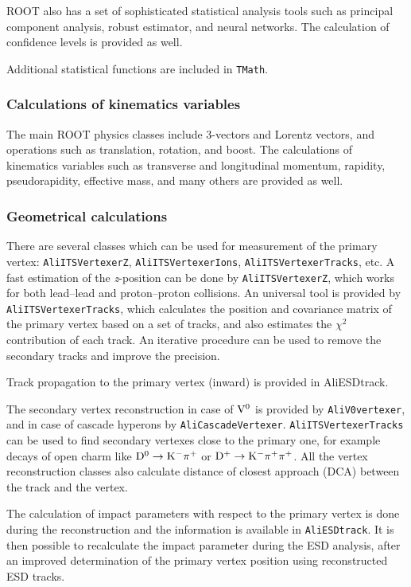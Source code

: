 \documentclass[12pt,a4paper,twoside]{article}
\makeatletter
\newcommand {\ROOT} {ROOT\@\xspace}
\makeatother
\begin{document}
{\ROOT also has a set of sophisticated statistical analysis tools such as
principal component analysis, robust estimator, and neural networks.
The calculation of confidence levels is provided as well.

Additional statistical functions are included in \texttt{TMath}.

\subsubsection{Calculations of kinematics variables}

The main \ROOT physics classes include 3-vectors and Lorentz
vectors, and operations
such as translation, rotation, and boost. The calculations of
kinematics variables 
such as transverse and longitudinal momentum, rapidity,
pseudorapidity, effective mass, and many others are provided as well.


\subsubsection{Geometrical calculations}

There are several classes which can be used for
measurement of the primary vertex: \texttt{AliITSVertexerZ},
\texttt{AliITSVertexerIons}, \texttt{AliITSVertexerTracks}, etc. A fast estimation of the {\it z}-position can be
done by \texttt{AliITSVertexerZ}, which works for both lead--lead
and proton--proton collisions. An universal tool is provided by
\texttt{AliITSVertexerTracks}, which calculates the position and
covariance matrix of the primary vertex based on a set of tracks, and
also estimates the $\chi^2$ contribution of each track. An iterative
procedure can be used to remove the secondary tracks and improve the
precision. 

Track propagation to the primary vertex (inward) is provided in
AliESDtrack.

The secondary vertex reconstruction in case of ${\rm V^0}$ is provided by
\texttt{AliV0vertexer}, and in case of cascade hyperons by
\texttt{AliCascadeVertexer}. 
\texttt{AliITSVertexerTracks} can be used to find secondary
vertexes close to the primary one, for example decays of open charm
like ${\rm D^0 \to K^- \pi^+}$ or ${\rm D^+ \to K^- \pi^+ \pi^+}$. All
the vertex 
reconstruction classes also calculate distance of closest approach (DCA)
between the track and the vertex.

The calculation of impact parameters with respect to the primary vertex
is done during the reconstruction and the information is available in
\texttt{AliESDtrack}. It is then possible to recalculate the
impact parameter during the ESD analysis, after an improved determination
of the primary vertex position using reconstructed ESD tracks.

}
\end{document}
